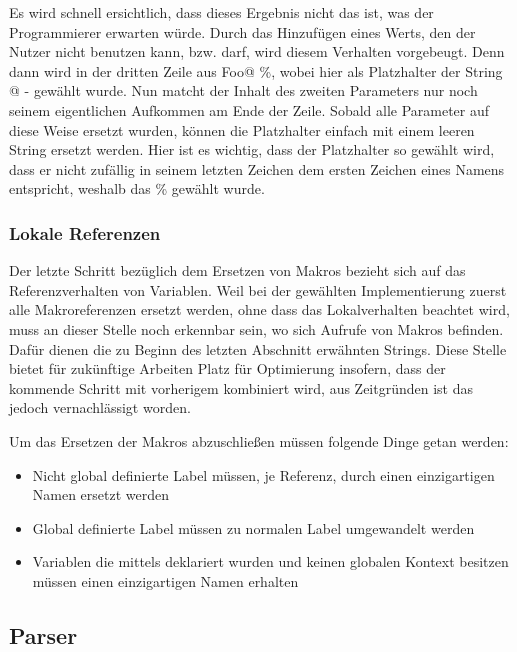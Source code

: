 Es wird schnell ersichtlich, dass dieses Ergebnis nicht das ist, was der Programmierer erwarten würde. Durch das Hinzufügen eines Werts, den der Nutzer nicht benutzen kann, bzw. darf, wird diesem Verhalten vorgebeugt. Denn dann wird in der dritten Zeile aus  \glqq Foo@ \%\grqq, wobei hier als Platzhalter der String \glqq @ -\grqq{} gewählt wurde. Nun matcht der Inhalt des zweiten Parameters nur noch seinem eigentlichen Aufkommen am Ende der Zeile. Sobald alle Parameter auf diese Weise ersetzt wurden, können die Platzhalter einfach mit einem leeren String ersetzt werden. Hier ist es wichtig, dass der Platzhalter so gewählt wird, dass er nicht zufällig in seinem letzten Zeichen dem ersten Zeichen eines Namens entspricht, weshalb das \glqq \%\grqq{} gewählt wurde.

\subsubsection{Lokale Referenzen}\label{chap:local-refs}

Der letzte Schritt bezüglich dem Ersetzen von Makros bezieht sich auf das Referenzverhalten von Variablen. Weil bei der gewählten Implementierung zuerst alle Makroreferenzen ersetzt werden, ohne dass das Lokalverhalten beachtet wird, muss an dieser Stelle noch erkennbar sein, wo sich Aufrufe von Makros befinden. Dafür dienen die zu Beginn des letzten Abschnitt erwähnten Strings. Diese Stelle bietet für zukünftige Arbeiten Platz für Optimierung insofern, dass der kommende Schritt mit vorherigem kombiniert wird, aus Zeitgründen ist das jedoch vernachlässigt worden.

Um das Ersetzen der Makros abzuschließen müssen folgende Dinge getan werden: 

\begin{itemize}
	\item Nicht global definierte Label müssen, je Referenz, durch einen einzigartigen Namen ersetzt werden
	\item Global definierte Label müssen zu \glqq normalen\grqq{} Label umgewandelt werden
	\item Variablen die mittels  deklariert wurden und keinen globalen Kontext besitzen müssen einen einzigartigen Namen erhalten
\end{itemize}

\subsection{Parser}

